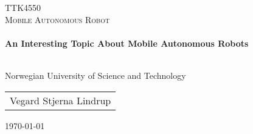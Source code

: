 \begin{titlepage}
{\vspace*{3cm}}
\begin{center}

\textsc{\large TTK4550} \\ [1cm]
\textsc{\Large Mobile Autonomous Robot} \\ [0.5cm]

\HRule \\[0.5cm]
{ \huge \bfseries  An Interesting Topic About Mobile Autonomous Robots } \\[0.2cm]
\HRule \\[0.5cm]
{\vspace*{0.3cm}}
\begin{large}
    Norwegian University of Science and Technology \\
\end{large}
{\vspace*{4cm}}

{\em
    \begin{tabular}{c}
    Vegard Stjerna Lindrup  \\
    \end{tabular}
}



\vfill
{\small \today}
\end{center}
\end{titlepage}